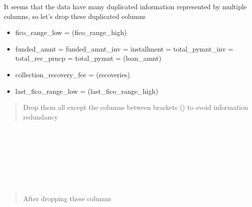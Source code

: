 \documentclass[11pt]{article}
\providecommand{\tightlist}{%
      \setlength{\itemsep}{0pt}\setlength{\parskip}{0pt}}
\begin{document}
    It seems that the data have many duplicated information represented by
multiple columns, so let's drop these duplicated columns

\begin{itemize}
\tightlist
\item
  fico\_range\_low = (fico\_range\_high)
\item
  funded\_amnt = funded\_amnt\_inv = installment = total\_pymnt\_inv =
  total\_rec\_prncp = total\_pymnt = (loan\_amnt)
\item
  collection\_recovery\_fee = (recoveries)
\item
  last\_fico\_range\_low = (last\_fico\_range\_high)
\end{itemize}

\begin{quote}
Drop them all except the columns between brackets () to avoid
information redundancy
\end{quote}

    \begin{center}
    \end{center}
    { \hspace*{\fill} \\}
    
    \begin{center}
    \end{center}
    { \hspace*{\fill} \\}
    
    \begin{center}
    \end{center}
    { \hspace*{\fill} \\}
    
    \begin{center}
    \end{center}
    { \hspace*{\fill} \\}
    
    \begin{quote}
After dropping these columns
\end{quote}
\end{document}
